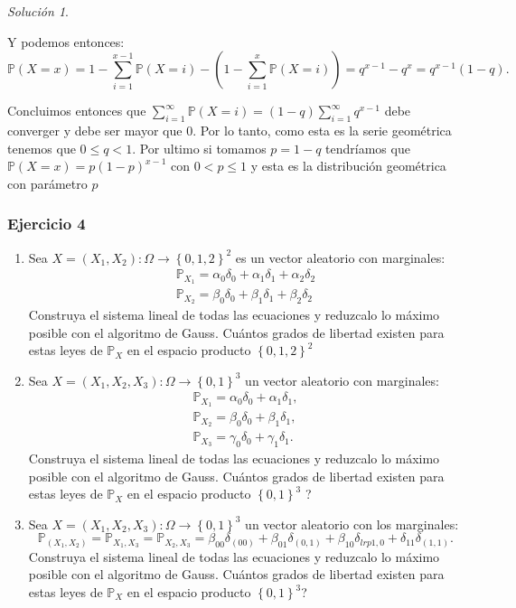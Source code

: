 \documentclass[notitlepage]{article}
\theoremstyle{definition}
\theoremstyle{remark}
\newtheorem*{sol}{Solución}
\newcommand{\prob}[1]{\mathbb{P}(#1)}
\newcommand{\lrp}[1]{\left( #1 \right)}
\newcommand{\set}[1]{\left\lbrace #1 \right\rbrace}
\begin{document}
\begin{sol}
\begin{enumerate}
			Y podemos entonces:
			\begin{equation}
			\prob{X=x}= 1-\sum_{i=1}^{x-1}\prob{X=i}-(1-\sum_{i=1}^{x} \prob{X=i}) = q^{x-1}-q^{x} = q^{x-1}(1-q). \nonumber
			\end{equation}
			
			Concluimos entonces que $ \sum_{i=1}^\infty \prob{X=i} = (1-q)\sum_{i=1}^\infty q^{x-1} $ debe converger y debe ser mayor que 0. Por lo tanto, como esta es la serie geométrica tenemos que $ 0 \leq q < 1 $. Por ultimo si tomamos $ p = 1- q $ tendríamos que $ \prob{X=x} = p(1-p)^{x-1} $ con $ 0<p\leq 1 $ y esta es la distribución geométrica con parámetro $ p $
		\end{enumerate}
		\end{sol}
		
	
	\subsubsection*{Ejercicio 4}
	
	\begin{enumerate}[1)]
		\item Sea $ X = (X_1,X_2): \Omega \rightarrow \set{0,1,2}^2 $ es un vector aleatorio con marginales:
		\begin{align*}
		\mathbb{P}_{X_1} = \alpha_0\delta_0 + \alpha_1\delta_1 + \alpha_2\delta_2 \\
		\mathbb{P}_{X_2} = \beta_0\delta_0 + \beta_1\delta_1 + \beta_2\delta_2
		\end{align*}
		Construya el sistema lineal de todas las ecuaciones y reduzcalo lo máximo posible con el algoritmo de Gauss. Cuántos grados de libertad existen para estas leyes de $ \mathbb{P}_X $ en el espacio producto $ \set{0,1,2}^2 $
		\item Sea $ X = \lrp{X_1, X_2, X_3}: \Omega \rightarrow \set{0,1}^3 $ un vector aleatorio con marginales:
		\begin{align*}
		\mathbb{P}_{X_1} = \alpha_0\delta_0 + \alpha_1\delta_1, \\
		\mathbb{P}_{X_2} = \beta_0\delta_0 + \beta_1\delta_1, \\
		\mathbb{P}_{X_3} = \gamma_0\delta_0 + \gamma_1\delta_1.
		\end{align*}
		Construya el sistema lineal de todas las ecuaciones y reduzcalo lo máximo posible con el algoritmo de Gauss. Cuántos grados de libertad existen para estas leyes de $ \mathbb{P}_X $ en el espacio producto $ \set{0,1}^3 $ ?
		\item Sea $ X = \lrp{X_1,X_2,X_3}: \Omega \rightarrow \set{0,1}^3 $ un vector aleatorio con los marginales:
		\[ \mathbb{P}_{\lrp{X_1,X_2}} = \mathbb{P}_{X_1,X_3} = \mathbb{P}_{X_2,X_3} = \beta_{00}\delta_{\lrp{00}} + \beta_{01}\delta_{\lrp{0,1}} + \beta_{10}\delta_{lrp{1,0}} + \delta_{11}\delta_{\lrp{1,1}}. \]
		Construya el sistema lineal de todas las ecuaciones y reduzcalo lo máximo posible con el algoritmo de Gauss. Cuántos grados de libertad existen para estas leyes de $ \mathbb{P}_X $ en el espacio producto $ \set{0,1}^3 $?
	\end{enumerate}
	
\end{document}
